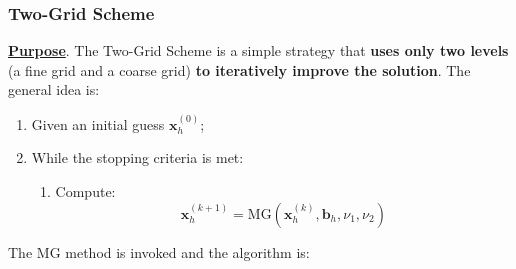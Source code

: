 \subsubsection{Two-Grid Scheme}\label{subsubsection: Two-Grid Scheme}

\textbf{\underline{Purpose}}. The Two-Grid Scheme is a simple strategy that \textbf{uses only two levels} (a fine grid and a coarse grid) \textbf{to iteratively improve the solution}. The general idea is:
\begin{enumerate}
    \item Given an initial guess $\mathbf{x}_{h}^{\left(0\right)}$;
    \item While the stopping criteria is met:
        \begin{enumerate}
            \item Compute:
            \begin{equation}
                \mathbf{x}_{h}^{\left(k+1\right)} = \mathrm{MG}\left(\mathbf{x}_{h}^{\left(k\right)}, \mathbf{b}_{h}, \nu_{1}, \nu_{2}\right)
            \end{equation}
        \end{enumerate} 
\end{enumerate}
The $\mathrm{MG}$ method is invoked and the algorithm is:
